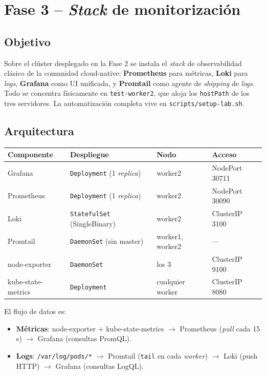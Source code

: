 \section{Fase 3 -- \emph{Stack} de monitorización}

\subsection{Objetivo}

Sobre el clúster desplegado en la Fase 2 se instala el \emph{stack} de observabilidad clásico de la comunidad cloud-native: \textbf{Prometheus} para métricas, \textbf{Loki} para \emph{logs}, \textbf{Grafana} como UI unificada, y \textbf{Promtail} como agente de \emph{shipping} de \emph{logs}. Todo se concentra físicamente en \texttt{test-worker2}, que aloja los \texttt{hostPath} de los tres servidores. La automatización completa vive en \texttt{scripts/setup-lab.sh}.

\subsection{Arquitectura}

\begin{center}
\begin{tabular}{|l|l|l|l|}
\hline
\textbf{Componente} & \textbf{Despliegue} & \textbf{Nodo} & \textbf{Acceso} \\
\hline
Grafana       & \texttt{Deployment} (1 \emph{replica})       & worker2          & NodePort 30711 \\
Prometheus    & \texttt{Deployment} (1 \emph{replica})       & worker2          & NodePort 30090 \\
Loki          & \texttt{StatefulSet} (SingleBinary)          & worker2          & ClusterIP 3100 \\
Promtail      & \texttt{DaemonSet} (sin master)              & worker1, worker2 & --- \\
node-exporter & \texttt{DaemonSet}                           & los 3            & ClusterIP 9100 \\
kube-state-metrics & \texttt{Deployment}                     & cualquier worker & ClusterIP 8080 \\
\hline
\end{tabular}
\end{center}

El flujo de datos es:

\begin{itemize}
  \item \textbf{Métricas}: node-exporter + kube-state-metrics $\to$ Prometheus (\emph{pull} cada 15\,s) $\to$ Grafana (consultas PromQL).
  \item \textbf{Logs}: \texttt{/var/log/pods/*} $\to$ Promtail (\texttt{tail} en cada \emph{worker}) $\to$ Loki (push HTTP) $\to$ Grafana (consultas LogQL).
\end{itemize}

